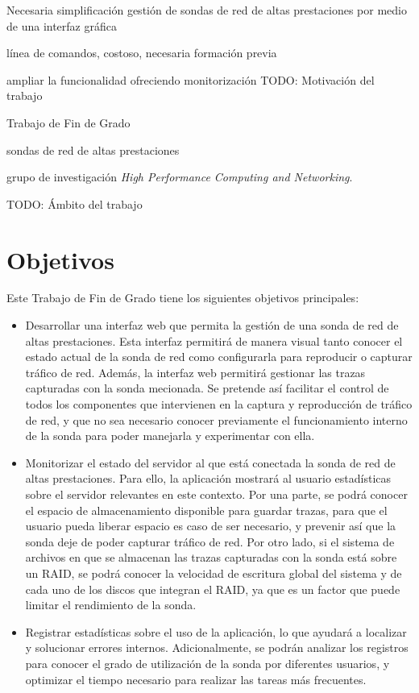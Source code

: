 Necesaria simplificación gestión de sondas de red de altas prestaciones por medio de una interfaz gráfica
 
línea de comandos, costoso, necesaria formación previa

ampliar la funcionalidad ofreciendo monitorización 
TODO: Motivación del trabajo

Trabajo de Fin de Grado

 sondas de red de altas prestaciones

grupo de investigación \textit{High Performance Computing and Networking}. 

TODO: Ámbito del trabajo

\section{Objetivos}

Este Trabajo de Fin de Grado tiene los siguientes objetivos principales:

\begin{itemize}
  \item Desarrollar una interfaz web que permita la gestión de una sonda de red de altas prestaciones. Esta interfaz permitirá de manera visual tanto conocer el estado actual de la sonda de red como configurarla para reproducir o capturar tráfico de red. Además, la interfaz web permitirá gestionar las \glspl{traza} capturadas con la sonda mecionada. Se pretende así facilitar el control de todos los componentes que intervienen en la captura y reproducción de tráfico de red, y que no sea necesario conocer previamente el funcionamiento interno de la sonda para poder manejarla y experimentar con ella.

  \item Monitorizar el estado del servidor al que está conectada la sonda de red de altas prestaciones. Para ello, la aplicación mostrará al usuario estadísticas sobre el servidor relevantes en este contexto. Por una parte, se podrá conocer el espacio de almacenamiento disponible para guardar \glspl{traza}, para que el usuario pueda liberar espacio es caso de ser necesario, y prevenir así que la sonda deje de poder capturar tráfico de red. Por otro lado, si el sistema de archivos en que se almacenan las \glspl{traza} capturadas con la sonda está sobre un \gls{RAID}, se podrá conocer la velocidad de escritura global del sistema y de cada uno de los discos que integran el \gls{RAID}, ya que es un factor que puede limitar el rendimiento de la sonda.

  \item Registrar estadísticas sobre el uso de la aplicación, lo que ayudará a localizar y solucionar errores internos. Adicionalmente, se podrán analizar los registros para conocer el grado de utilización de la sonda por diferentes usuarios, y optimizar el tiempo necesario para realizar las tareas más frecuentes.
\end{itemize}

